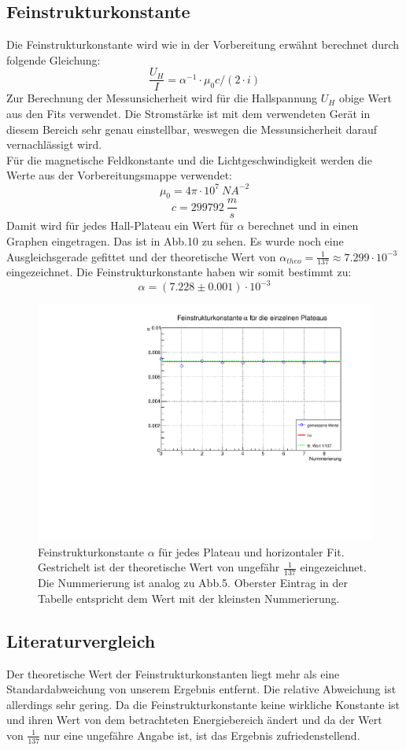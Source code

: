 \subsection{Feinstrukturkonstante}
Die Feinstrukturkonstante wird wie in der Vorbereitung erwähnt berechnet durch folgende Gleichung:
$$\frac{U_H}{I} = \alpha ^{-1} \cdot \mu _0 c / (2 \cdot i) $$
Zur Berechnung der Messunsicherheit wird für die Hallspannung $U_H$ obige Wert aus den Fits verwendet. Die Stromstärke ist mit dem verwendeten Gerät in diesem Bereich sehr genau einstellbar, weswegen die Messunsicherheit darauf vernachlässigt wird. \\
Für die magnetische Feldkonstante und die Lichtgeschwindigkeit werden die Werte aus der Vorbereitungsmappe verwendet:
$$\mu _0 = 4 \pi \cdot 10^{7} \ NA^{-2} $$
$$c = 299792 \ \frac{m}{s} $$
Damit wird für jedes Hall-Plateau ein Wert für $\alpha$ berechnet und in einen Graphen eingetragen. Das ist in Abb.10 zu sehen. Es wurde noch eine Ausgleichsgerade gefittet und der theoretische Wert von $\alpha _{theo} = \frac{1}{137} \approx 7.299 \cdot 10^{-3}$ eingezeichnet. Die Feinstrukturkonstante haben wir somit bestimmt zu:
$$\alpha = (7.228 \pm 0.001) \cdot 10^{-3}$$

\begin{figure}
\centering
\includegraphics[scale=0.5]{../plots/alpha.pdf}
\caption{Feinstrukturkonstante $\alpha$ für jedes Plateau und horizontaler Fit. Gestrichelt ist der theoretische Wert von ungefähr $\frac{1}{137}$ eingezeichnet. Die Nummerierung ist analog zu Abb.5. Oberster Eintrag in der Tabelle entspricht dem Wert mit der kleinsten Nummerierung.}
\end{figure}

\subsection{Literaturvergleich}
Der theoretische Wert der Feinstrukturkonstanten liegt mehr als eine Standardabweichung von unserem Ergebnis entfernt. Die relative Abweichung ist allerdings sehr gering. Da die Feinstrukturkonstante keine wirkliche Konstante ist und ihren Wert von dem betrachteten Energiebereich ändert und da der Wert von $\frac{1}{137}$ nur eine ungefähre Angabe ist, ist das Ergebnis zufriedenstellend.